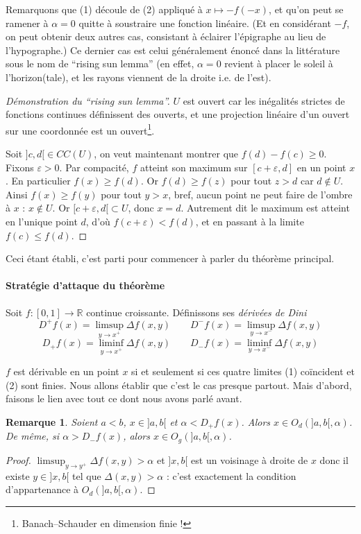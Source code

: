 \documentclass[a4paper, 11pt]{article}
\def\R{\mathbb{R}}
\newtheorem*{remark}{Remarque}
\begin{document}
Remarquons que (1) découle de (2) appliqué à $x \mapsto -f(-x)$, et qu'on peut
se ramener à $\alpha = 0$ quitte à soustraire une fonction linéaire. (Et en
considérant $-f$, on peut obtenir deux autres cas, consistant à éclairer
l'épigraphe au lieu de l'hypographe.) Ce dernier cas est celui généralement
énoncé dans la littérature sous le nom de \enquote{rising sun lemma} (en effet,
$\alpha = 0$ revient à placer le soleil à l'horizon(tale), et les rayons
viennent de la droite i.e. de l'est).

\begin{proof}[Démonstration du \enquote{rising sun lemma}]
  $U$ est ouvert car les inégalités strictes de fonctions continues définissent
  des ouverts, et une projection linéaire d'un ouvert sur une coordonnée
  est un ouvert\footnote{Banach--Schauder en dimension finie !}.

  Soit $]c,d[ \in CC(U)$, on veut maintenant montrer que $f(d) - f(c) \geq 0$.
  Fixons $\varepsilon > 0$. Par compacité, $f$ atteint son maximum sur
  $[c+\varepsilon, d]$ en un point $x$. En particulier $f(x) \geq f(d)$. Or
  $f(d) \geq f(z)$ pour tout $z > d$ car $d \not\in U$. Ainsi $f(x) \geq f(y)$
  pour tout $y > x$, bref, aucun point ne peut faire de l'ombre à $x$ : $x
  \not\in U$. Or $[c+\varepsilon,d[ \subset U$, donc $x = d$. Autrement dit le
  maximum est atteint en l'unique point $d$, d'où $f(c+\varepsilon) < f(d)$, et
  en passant à la limite $f(c) \leq f(d)$.
\end{proof}

Ceci étant établi, c'est parti pour commencer à parler du théorème principal.

\paragraph{Stratégie d'attaque du théorème}
Soit $f : [0,1] \to \R$ continue croissante.
Définissons ses \emph{dérivées de Dini}
\[ D^+f(x) = \limsup_{y \to x^+} \Delta f(x,y) \qquad
  D^-f(x) = \limsup_{y \to x^-} \Delta f(x,y) \]
\[  D_+f(x) = \liminf_{y \to x^+} \Delta f(x,y) \qquad
  D_-f(x) = \liminf_{y \to x^-} \Delta f(x,y) \]

$f$ est dérivable en un point $x$ si et seulement si ces quatre limites (1)
coïncident et (2) sont finies. Nous allons établir que c'est le cas presque
partout. Mais d'abord, faisons le lien avec tout ce dont nous avons parlé avant.

\begin{remark}
  Soient $a < b$, $x \in ]a,b[$ et $\alpha < D_+f(x)$. Alors $x \in O_d(]a,b[,
  \alpha)$. De même, si $\alpha > D_-f(x)$, alors $x \in O_g(]a,b[, \alpha)$.
\end{remark}
\begin{proof}
  $\limsup_{y \to y^+} \Delta f(x,y) > \alpha$ et $]x,b[$ est un voisinage à
  droite de $x$ donc il existe $y \in ]x,b[$ tel que $\Delta(x,y) > \alpha$ :
  c'est exactement la condition d'appartenance à $O_d(]a,b[,\alpha)$.
\end{proof}
\end{document}
